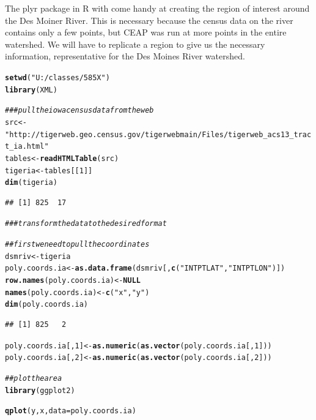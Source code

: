 \documentclass{article}\usepackage[]{graphicx}\usepackage[]{color}
\makeatletter
\newcommand{\hlnum}[1]{\textcolor[rgb]{0.686,0.059,0.569}{#1}}%
\newcommand{\hlstr}[1]{\textcolor[rgb]{0.192,0.494,0.8}{#1}}%
\newcommand{\hlcom}[1]{\textcolor[rgb]{0.678,0.584,0.686}{\textit{#1}}}%
\newcommand{\hlstd}[1]{\textcolor[rgb]{0.345,0.345,0.345}{#1}}%
\newcommand{\hlkwa}[1]{\textcolor[rgb]{0.161,0.373,0.58}{\textbf{#1}}}%
\newcommand{\hlkwb}[1]{\textcolor[rgb]{0.69,0.353,0.396}{#1}}%
\newcommand{\hlkwc}[1]{\textcolor[rgb]{0.333,0.667,0.333}{#1}}%
\newcommand{\hlkwd}[1]{\textcolor[rgb]{0.737,0.353,0.396}{\textbf{#1}}}%
\newenvironment{kframe}{%
 \def\at@end@of@kframe{}%
 \ifinner\ifhmode%
  \def\at@end@of@kframe{\end{minipage}}%
  \begin{minipage}{\columnwidth}%
 \fi\fi%
 \def\FrameCommand##1{\hskip\@totalleftmargin \hskip-\fboxsep
 \colorbox{shadecolor}{##1}\hskip-\fboxsep
     \hskip-\linewidth \hskip-\@totalleftmargin \hskip\columnwidth}%
 \MakeFramed {\advance\hsize-\width
   \@totalleftmargin\z@ \linewidth\hsize
   \@setminipage}}%
 {\par\unskip\endMakeFramed%
 \at@end@of@kframe}
\newenvironment{knitrout}{}{} %
\makeatother
\begin{document}
\begin{itemize}
The plyr package in R with come handy at creating the region of interest around the Des Moiner River. This is necessary because the census data on the river contains only a few points, but CEAP was run at more points in the entire watershed. We will have to replicate a region to give us the necessary information, representative for the Des Moines River watershed.


\begin{knitrout}
\color{fgcolor}\begin{kframe}
\begin{alltt}
\hlkwd{setwd}\hlstd{(}\hlstr{"U:/classes/585X"}\hlstd{)}
\hlkwd{library}\hlstd{(XML)}

\hlcom{### pull the iowa census data from the web}
\hlstd{src} \hlkwb{<-} \hlstr{"http://tigerweb.geo.census.gov/tigerwebmain/Files/tigerweb_acs13_tract_ia.html"}
\hlstd{tables} \hlkwb{<-} \hlkwd{readHTMLTable}\hlstd{(src)}
\hlstd{tigeria} \hlkwb{<-} \hlstd{tables[[}\hlnum{1}\hlstd{]]}
\hlkwd{dim}\hlstd{(tigeria)}
\end{alltt}
\begin{verbatim}
## [1] 825  17
\end{verbatim}
\begin{alltt}
\hlcom{### transform the data to the desired format}

\hlcom{## first we need to pull the coordinates}
\hlstd{dsmriv} \hlkwb{<-} \hlstd{tigeria}
\hlstd{poly.coords.ia} \hlkwb{<-} \hlkwd{as.data.frame}\hlstd{(dsmriv[,} \hlkwd{c}\hlstd{(}\hlstr{"INTPTLAT"}\hlstd{,} \hlstr{"INTPTLON"}\hlstd{)])}
\hlkwd{row.names}\hlstd{(poly.coords.ia)} \hlkwb{<-} \hlkwa{NULL}
\hlkwd{names}\hlstd{(poly.coords.ia)} \hlkwb{<-} \hlkwd{c}\hlstd{(}\hlstr{"x"}\hlstd{,} \hlstr{"y"}\hlstd{)}
\hlkwd{dim}\hlstd{(poly.coords.ia)}
\end{alltt}
\begin{verbatim}
## [1] 825   2
\end{verbatim}
\begin{alltt}
\hlstd{poly.coords.ia[,} \hlnum{1}\hlstd{]} \hlkwb{<-} \hlkwd{as.numeric}\hlstd{(}\hlkwd{as.vector}\hlstd{(poly.coords.ia[,} \hlnum{1}\hlstd{]))}
\hlstd{poly.coords.ia[,} \hlnum{2}\hlstd{]} \hlkwb{<-} \hlkwd{as.numeric}\hlstd{(}\hlkwd{as.vector}\hlstd{(poly.coords.ia[,} \hlnum{2}\hlstd{]))}

\hlcom{## plot the area}
\hlkwd{library}\hlstd{(ggplot2)}
\end{alltt}


{\ttfamily\noindent\color{warningcolor}{\#\# Warning: package 'ggplot2' was built under R version 3.0.3}}\begin{alltt}
\hlkwd{qplot}\hlstd{(y, x,} \hlkwc{data} \hlstd{= poly.coords.ia)}



\end{alltt}
\end{kframe}
\end{knitrout}
\end{itemize}
\end{document}

